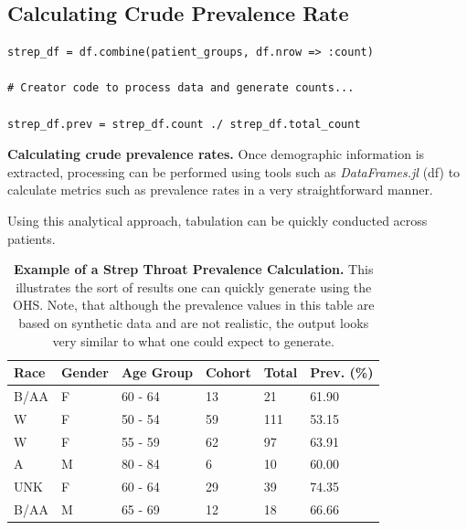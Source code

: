 \documentclass{juliacon}
\begin{document}
\subsection{Calculating Crude Prevalence Rate}


\begin{listing}[!ht]
\begin{verbatim}
strep_df = df.combine(patient_groups, df.nrow => :count)

# Creator code to process data and generate counts...

strep_df.prev = strep_df.count ./ strep_df.total_count 
\end{verbatim}
\caption{\textbf{Calculating crude prevalence rates.} Once demographic information is extracted, processing can be performed using tools such as \textit{DataFrames.jl} (df) to calculate metrics such as prevalence rates in a very straightforward manner.}
\label{listing:prevalence}
\end{listing}

Using this analytical approach, tabulation can be quickly conducted across patients.


\begin{table}[!ht]
    \centering
    \begin{tabular}{|l|l|l|l|l|l|}
    \hline
        Race & Gender & Age Group & Cohort & Total & Prev. (\%) \\ \hline
        B/AA & F & 60 - 64 & 13 & 21 & 61.90 \\ \hline
        W & F & 50 - 54 & 59 & 111 & 53.15 \\ \hline
        W & F & 55 - 59 & 62 & 97 & 63.91 \\ \hline
        A & M & 80 - 84 & 6 & 10 & 60.00 \\ \hline
        UNK & F & 60 - 64 & 29 & 39 & 74.35 \\ \hline
        B/AA & M & 65 - 69 & 12 & 18 & 66.66 \\ \hline
    \end{tabular}
    \caption{\textbf{Example of a Strep Throat Prevalence Calculation.} This illustrates the sort of results one can quickly generate using the OHS. Note, that although the prevalence values in this table are based on synthetic data and are not realistic, the output looks very similar to what one could expect to generate.}
    \label{table:eunomia_prevalence}
\end{table}
\end{document}
